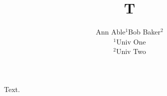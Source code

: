 \documentclass{article}
\title{T}
\author{Ann Able$^{1}$\hspace{0pt}Bob Baker$^{2}$\\ $^1$Univ One\\ $^2$Univ Two}
\begin{document}
\maketitle
Text.
\end{document}
